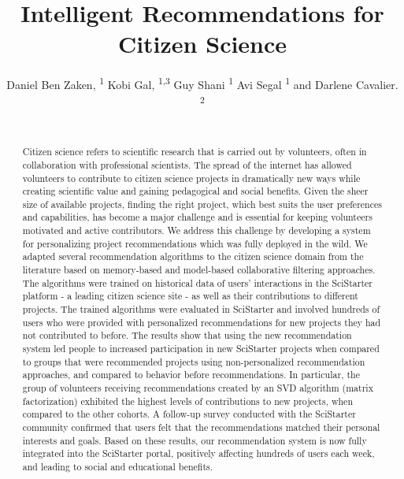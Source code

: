 \documentclass[letterpaper]{article} %
\title{Intelligent Recommendations for Citizen Science}
\author{ 
    Daniel Ben Zaken, \textsuperscript{\rm 1}
    Kobi Gal, \textsuperscript{\rm 1,3}
    Guy Shani \textsuperscript{\rm 1}
    Avi Segal \textsuperscript{\rm 1} and
    Darlene Cavalier. \textsuperscript{\rm 2}
    \\
    \\
}
\begin{document}
\maketitle
\begin{abstract} 
Citizen science refers to scientific research that is carried out by volunteers, often in collaboration with professional scientists.
The spread of the internet has allowed volunteers to contribute to citizen science projects in  dramatically new ways while creating scientific value and gaining pedagogical and social benefits.  
Given the sheer size of available projects, finding the right project, which best suits the user preferences and capabilities, has become a major challenge and is essential for keeping volunteers motivated and active contributors. 
We address this challenge by developing a system for personalizing  project recommendations which was fully deployed in  the wild.  
We adapted several recommendation algorithms to the citizen science domain from the literature based on memory-based and model-based collaborative filtering approaches.  The algorithms were trained on historical data of users' interactions in the SciStarter platform - a leading citizen science site - 
as well as their contributions to different projects. 
The trained algorithms were evaluated in SciStarter and involved hundreds of users who were  provided with personalized recommendations for  new  projects they had not contributed to before. %
The results show that using the new recommendation system  led people to  increased participation in new SciStarter projects when compared to   groups that were recommended projects using non-personalized 
 recommendation approaches,  
and compared to behavior before recommendations.   In particular, the group of volunteers receiving recommendations created by an SVD algorithm (matrix factorization) exhibited the highest levels of contributions to new projects, when compared to the other cohorts.  
A follow-up survey conducted with the SciStarter 
community confirmed that users felt that the recommendations  matched their personal interests and goals. 
Based on these results, our recommendation system is now fully integrated into the SciStarter  portal, positively affecting hundreds of users each week, and  leading to social and educational benefits. 

\end{abstract}
\end{document}
